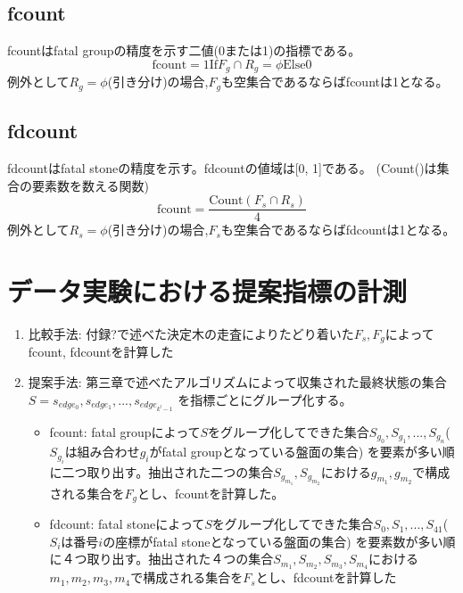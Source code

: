 \subsection{fcount}
fcountはfatal groupの精度を示す二値(0または1)の指標である。
\begin{equation}
	{\textrm{fcount} = 1 \textrm{If} F_g \cap R_g = \phi \textrm{Else} 0}
\end{equation}
例外として$R_g=\phi$(引き分け)の場合,$F_g$も空集合であるならばfcountは1となる。
\subsection{fdcount}
fdcountはfatal stoneの精度を示す。fdcountの値域は[0, 1]である。
(Count()は集合の要素数を数える関数)
\begin{equation}
	{\textrm{fcount} = \frac{\textrm{Count}(F_s \cap R_s)}{4}  }
\end{equation}
例外として$R_s=\phi$(引き分け)の場合,$F_s$も空集合であるならばfdcountは1となる。
\section{データ実験における提案指標の計測}

\begin{enumerate}
	\item 比較手法: 付録?で述べた決定木の走査によりたどり着いた$F_s, F_g$によってfcount, fdcountを計算した
	\item 提案手法: 第三章で述べたアルゴリズムによって収集された最終状態の集合$S={s_{edge_0}, s_{edge_1}, ..., s_{edge_{k^l-1}}}$
	    を指標ごとにグループ化する。
		\begin{itemize}
			\item fcount: fatal groupによって$S$をグループ化してできた集合${S_{g_0}, S_{g_1}, ..., S_{g_n}}$($S_{g_i}$は組み合わせ$g_i$がfatal groupとなっている盤面の集合)
			を要素が多い順に二つ取り出す。抽出された二つの集合${S_{g_{m_1}}, S_{g_{m_2}}}$における${g_{m_1}, g_{m_2}}$で構成される集合を$F_g$とし、fcountを計算した。
			\item fdcount: fatal stoneによって$S$をグループ化してできた集合${S_0, S_1, ..., S_41}$($S_i$は番号$i$の座標がfatal stoneとなっている盤面の集合)
			を要素数が多い順に４つ取り出す。抽出された４つの集合${S_{m_1}, S_{m_2}, S_{m_3}, S_{m_4}}$における${m_1, m_2, m_3, m_4}$で構成される集合を$F_s$とし、fdcountを計算した
		\end{itemize}
		
\end{enumerate}

